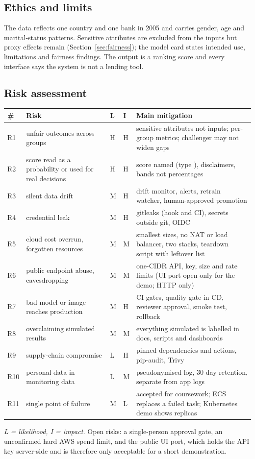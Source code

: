 \documentclass[11pt,a4paper]{article}
\newcommand{\code}[1]{\texttt{\detokenize{#1}}}
\newcommand{\hdr}[1]{\textbf{\color{navy}#1}}
\begin{document}
\subsection{Ethics and limits}
The data reflects one country and one bank in 2005 and carries gender, age and marital-status patterns. Sensitive attributes are excluded from the inputs but proxy effects remain (Section~\ref{sec:fairness}); the model card states intended use, limitations and fairness findings. The output is a ranking score and every interface says the system is not a lending tool.

\subsection{Risk assessment}
\begin{longtable}{L{0.8cm}L{5.0cm}L{0.9cm}L{0.9cm}L{6.0cm}}
\toprule
\hdr{\#} & \hdr{Risk} & \hdr{L} & \hdr{I} & \hdr{Main mitigation}\\
\midrule\endhead
R1 & unfair outcomes across groups & H & H & sensitive attributes not inputs; per-group metrics; challenger may not widen gaps\\
R2 & score read as a probability or used for real decisions & H & H & score named \code{risk_score} (type \code{uncalibrated_risk_score}), disclaimers, bands not percentages\\
R3 & silent data drift & M & H & drift monitor, alerts, retrain watcher, human-approved promotion\\
R4 & credential leak & M & H & gitleaks (hook and CI), secrets outside git, OIDC\\
R5 & cloud cost overrun, forgotten resources & M & M & smallest sizes, no NAT or load balancer, two stacks, teardown script with leftover list\\
R6 & public endpoint abuse, eavesdropping & M & M & one-CIDR API, key, size and rate limits (UI port open only for the demo; HTTP only)\\
R7 & bad model or image reaches production & M & H & CI gates, quality gate in CD, reviewer approval, smoke test, rollback\\
R8 & overclaiming simulated results & M & M & everything simulated is labelled in docs, scripts and dashboards\\
R9 & supply-chain compromise & L & H & pinned dependencies and actions, pip-audit, Trivy\\
R10 & personal data in monitoring data & L & M & pseudonymised log, 30-day retention, separate from app logs\\
R11 & single point of failure & M & L & accepted for coursework; ECS replaces a failed task; Kubernetes demo shows replicas\\
\bottomrule
\end{longtable}
\textit{L = likelihood, I = impact.} Open risks: a single-person approval gate, an unconfirmed hard AWS spend limit, and the public UI port, which holds the API key server-side and is therefore only acceptable for a short demonstration.
\end{document}
